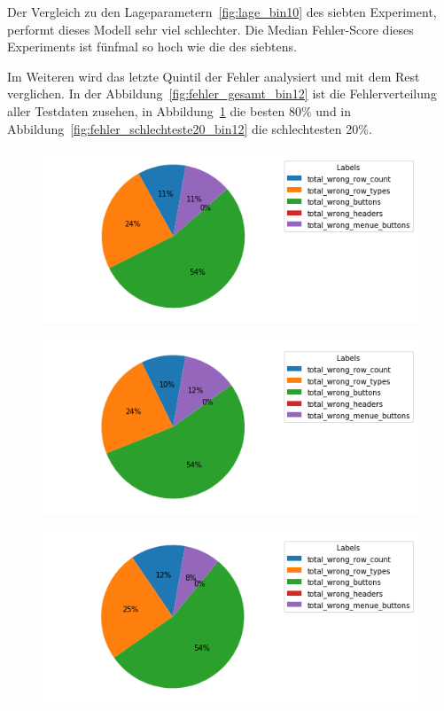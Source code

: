 \documentclass[pdftex,a4paper,halfparskip, article]{scrartcl}
\begin{document}
Der Vergleich zu den Lageparametern~\ref{fig:lage_bin10} des siebten Experiment, performt dieses Modell sehr viel schlechter. Die Median Fehler-Score dieses Experiments ist fünfmal so hoch wie die des siebtens.

Im Weiteren wird das letzte Quintil der Fehler analysiert und mit dem Rest verglichen. In der Abbildung~\ref{fig:fehler_gesamt_bin12} ist die Fehlerverteilung aller Testdaten zusehen, in Abbildung~\ref{fig:fehler_beste80_bin12} die besten 80\% und in Abbildung~\ref{fig:fehler_schlechteste20_bin12} die schlechtesten 20\%. 

\begin{figure}
\centering
\begin{minipage}{.5\textwidth}
  \centering
  \includegraphics[width=1\linewidth]{predictions_bin12_total_error_types_pie_chart}
  \label{fig:fehler_gesamt_bin12}
\end{minipage}%
\begin{minipage}{.5\textwidth}
  \centering
  \includegraphics[width=1\linewidth]{predictions_bin12_excluded_p80_error_types_pie_chart}
  \label{fig:fehler_beste80_bin12}
\end{minipage}
\begin{minipage}{.5\textwidth}
  \centering
   \includegraphics[width=1\linewidth]{predictions_bin12_p80_error_types_pie_chart}

\end{minipage}
\end{figure}
\end{document}
